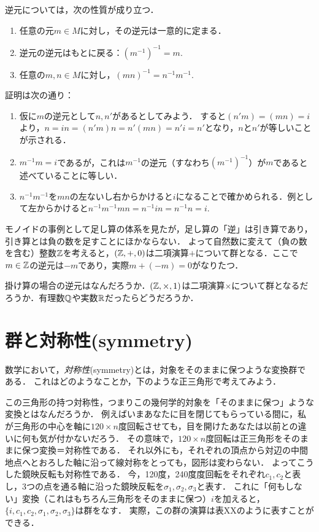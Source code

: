 \documentclass[11pt,a4paper,uplatex]{jsarticle}
\begin{document}
逆元については，次の性質が成り立つ．
\begin{enumerate}
    \item 任意の元$m \in M$に対し，その逆元は一意的に定まる．
    \item 逆元の逆元はもとに戻る：$(m^{-1})^{-1}=m$.
    \item 任意の$m,n \in M$に対し，$(mn)^{-1}=n^{-1}m^{-1}$.
\end{enumerate}
証明は次の通り：
\begin{enumerate}
    \item 仮に$m$の逆元として$n, n'$があるとしてみよう．
    すると$(n'm)=(mn)=i$より，$n = in = (n'm)n = n'(mn) = n'i = n'$となり，$n$と$n'$が等しいことが示される．
    \item $m^{-1}m=i$であるが，これは$m^{-1}$の逆元（すなわち$(m^{-1})^{-1}$）が$m$であると述べていることに等しい．
    \item $n^{-1}m^{-1}$を$mn$の左ないし右からかけると$i$になることで確かめられる．例として左からかけると$n^{-1}m^{-1}mn = n^{-1} i n = n^{-1}n = i$.
\end{enumerate}


\begin{example}
    モノイドの事例として足し算の体系を見たが，足し算の「逆」は引き算であり，引き算とは負の数を足すことにほかならない．
    よって自然数に変えて（負の数を含む）整数$\mathbb{Z}$を考えると，$(\mathbb{Z}, +, 0)$は二項演算$+$について群となる．ここで$m \in \mathbb{Z}$の逆元は$-m$であり，実際$m + (-m) = 0$がなりたつ．
\end{example}

\begin{exercise}
    掛け算の場合の逆元はなんだろうか．$(\mathbb{Z}, \times, 1)$は二項演算$\times$について群となるだろうか．有理数$\mathbb{Q}$や実数$\mathbb{R}$だったらどうだろうか．
\end{exercise}
 

\section{群と対称性(symmetry)}

数学において，\emph{対称性}(symmetry)とは，対象をそのままに保つような変換群である．
これはどのようなことか，下のような正三角形で考えてみよう．

この三角形の持つ対称性，つまりこの幾何学的対象を「そのままに保つ」ような変換とはなんだろうか．
例えばいまあなたに目を閉じてもらっている間に，私が三角形の中心を軸に$120\times n$度回転させても，目を開けたあなたは以前との違いに何も気が付かないだろう．
その意味で，$120\times n$度回転は正三角形をそのままに保つ変換＝対称性である．
それ以外にも，それぞれの頂点から対辺の中間地点へとおろした軸に沿って線対称をとっても，図形は変わらない．
よってこうした鏡映反転も対称性である．
今，120度，240度度回転をそれぞれ$c_1, c_2$と表し，3つの点を通る軸に沿った鏡映反転を$\sigma_1, \sigma_2, \sigma_3$と表す．
これに「何もしない」変換（これはもちろん三角形をそのままに保つ）$i$を加えると，$\{i, c_1, c_2, \sigma_1, \sigma_2, \sigma_3\}$は群をなす．
実際，この群の演算は表XXのように表すことができる．
\end{document}
